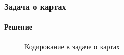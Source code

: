 \begin{frame}
\frametitle{Задача о картах}
\framesubtitle{Решение}
\begin{figure}
    \begin{center}
    \end{center}
    \caption{Кодирование в задаче о картах}\label{pict:cards}
\end{figure} 
\end{frame}

